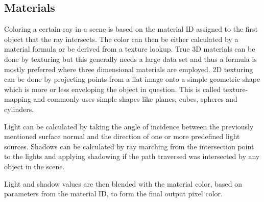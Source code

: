 			\subsection{Materials}
				Coloring a certain ray in a scene is based on the material ID
				assigned to the first object that the ray intersects. The color
				can then be either calculated by a material formula or be 
				derived from a texture lookup. True 3D materials can be done by
				texturing but this generally needs a large data set and thus a 
				formula is mostly preferred where three dimensional materials 
				are employed. 2D texturing can be done by projecting points from
				a flat image onto a simple geometric shape  which is more or less 
				enveloping the object in question. This is called texture-mapping 
				and commonly uses simple shapes like planes, cubes, spheres and 
				cylinders. 
				
				Light can be calculated by taking the angle of incidence between
				the previously mentioned surface normal and the direction of one 
				or more predefined light sources. Shadows can be calculated by 
				ray marching from the intersection point to the lights and 
				applying shadowing if the path traversed was intersected by any
				object in the scene. 
				
				Light and shadow values are then blended with the material color,
				based on parameters from the material ID, to form the final 
				output pixel color.
						
